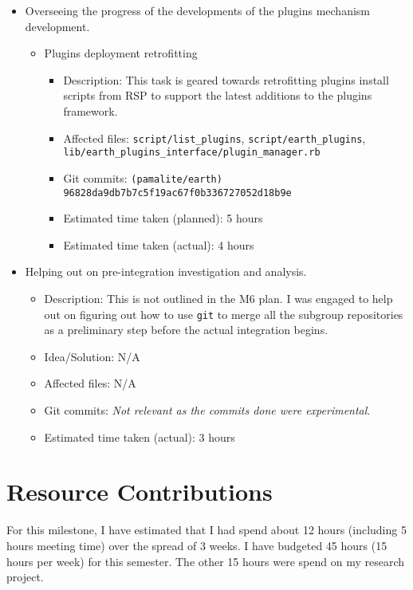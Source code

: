 \documentclass{article}
\begin{document}
\begin{itemize}
    \item Overseeing the progress of the developments of the plugins mechanism development.
        \begin{itemize}
            \item Plugins deployment retrofitting
                \begin{itemize}
                    \item Description: This task is geared towards retrofitting plugins install scripts from RSP to support the latest additions to the plugins framework.
                    \item Affected files: \texttt{script/list\_plugins}, \texttt{script/earth\_plugins}, \\ \texttt{lib/earth\_plugins\_interface/plugin\_manager.rb}
                    \item Git commits: \texttt{(pamalite/earth) 96828da9db7b7c5f19ac67f0b336727052d18b9e}
                    \item Estimated time taken (planned): 5 hours
                    \item Estimated time taken (actual): 4 hours
                \end{itemize}
        \end{itemize}
    \item Helping out on pre-integration investigation and analysis.
        \begin{itemize}
            \item Description: This is not outlined in the M6 plan. I was engaged to help out on figuring out how to use \texttt{git} to merge all the subgroup repositories as a preliminary step before the actual integration begins. 
	         \item Idea/Solution: N/A
	         \item Affected files: N/A
	         \item Git commits: \textit{Not relevant as the commits done were experimental.}
	         \item Estimated time taken (actual): 3 hours
	     \end{itemize}
\end{itemize}

\section*{Resource Contributions}

For this milestone, I have estimated that I had spend about 12 hours (including 5 hours meeting time) over the spread of 3 weeks. I have budgeted 45 hours (15 hours per week) for this semester. The other 15 hours were spend on my research project. 
\end{document}
